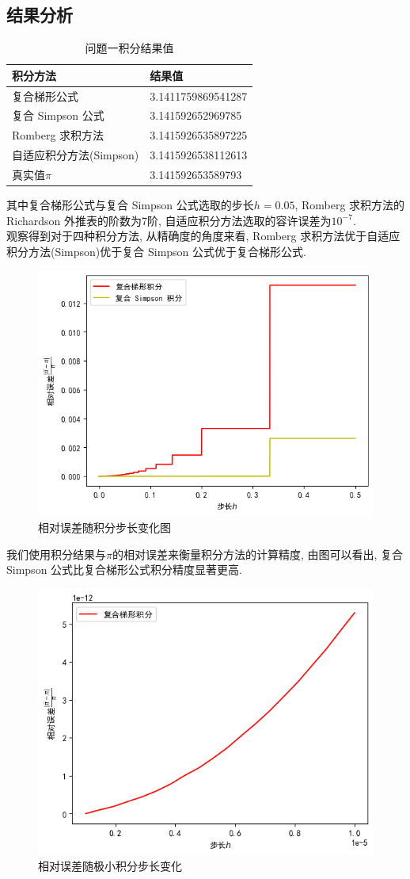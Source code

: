 \documentclass[UTF8,ctexart,a4paper,11pt,openany]{article}
\theoremstyle{definition}
\begin{document}
    \subsection{结果分析}%
    \begin{table}[H]
        \centering
        \begin{tabular}{ll}
            \toprule
            积分方法             & 结果值                \\ \midrule
            复合梯形公式           & 3.1411759869541287 \\
            复合 Simpson 公式    & 3.141592652969785  \\
            Romberg 求积方法     & 3.1415926535897225 \\
            自适应积分方法(Simpson) & 3.1415926538112613  \\ 
            真实值$\pi$ & 3.141592653589793  \\ \bottomrule
        \end{tabular}               
        \caption{问题一积分结果值}
    \end{table}
    其中复合梯形公式与复合 Simpson 公式选取的步长$h=0.05$, Romberg 求积方法的 Richardson 外推表的阶数为7阶, 自适应积分方法选取的容许误差为$10^{-7}$. \\
    观察得到对于四种积分方法, 从精确度的角度来看, Romberg 求积方法优于自适应积分方法(Simpson)优于复合 Simpson 公式优于复合梯形公式.  
    \begin{figure}[H]
        \centering
        \includegraphics[width=0.6\linewidth]{pics/P8.1.png}
        \caption{相对误差随积分步长变化图}
    \end{figure}
    我们使用积分结果与$\pi$的相对误差来衡量积分方法的计算精度, 由图可以看出, 复合 Simpson 公式比复合梯形公式积分精度显著更高.
    \begin{figure}[H]
        \centering
        \includegraphics[width=0.6\linewidth]{pics/P8.2.png}
        \caption{相对误差随极小积分步长变化}
    \end{figure}
\end{document}
